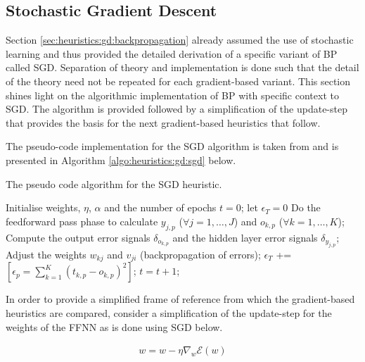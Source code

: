 \subsection{Stochastic Gradient Descent}
\label{sec:heuristics:gd:sgd}

Section \ref{sec:heuristics:gd:backpropagation} already assumed the use of stochastic learning and thus provided the detailed derivation of a specific variant of \ac{BP} called \acl{SGD}. Separation of theory and implementation is done such that the detail of the theory need not be repeated for each gradient-based variant. This section shines light on the algorithmic implementation of \ac{BP} with specific context to \ac{SGD}. The algorithm is provided followed by a simplification of the update-step that provides the basis for the next gradient-based heuristics that follow.

The pseudo-code implementation for the \ac{SGD} algorithm is taken from \cite{ref:engelbrecht:2007} and is presented in Algorithm \ref{algo:heuristics:gd:sgd} below.

\begin{algorithm}[H]
    \caption{The pseudo code algorithm for the \ac{SGD} heuristic.}
    \label{algo:heuristics:gd:sgd}
    \begin{algorithmic}
        \State Initialise weights, $\eta$, $\alpha$ and the number of epochs $t=0$;
            let $\epsilon_{T} = 0$
                \State Do the feedforward pass phase to calculate $y_{j,p}$ ($\forall j = 1, \dots, J$) and $o_{k,p}$ ($\forall k = 1, \dots, K$);
                \State Compute the output error signals $\delta_{o_{k,p}}$ and the hidden layer error signals $\delta_{y_{j,p}}$;
                \State Adjust the weights $w_{kj}$ and $v_{ji}$ (backpropagation of errors);
                \State $\epsilon_{T}$ += $[\epsilon_{p} = \sum^{K}_{k=1}(t_{k,p} - o_{k,p})^{2}]$;
            \EndFor
            \State $t = t + 1$;
        \EndWhile
    \end{algorithmic}
\end{algorithm}

In order to provide a simplified frame of reference from which the gradient-based heuristics are compared, consider a simplification of the update-step for the weights of the \ac{FFNN} as is done using \ac{SGD} below.

\begin{equation}
    \label{eq:heuristics:gd:sgd}
    \begin{split}
        w = w - \eta \nabla_{w}\mathcal{E}(w)
    \end{split}
\end{equation}

